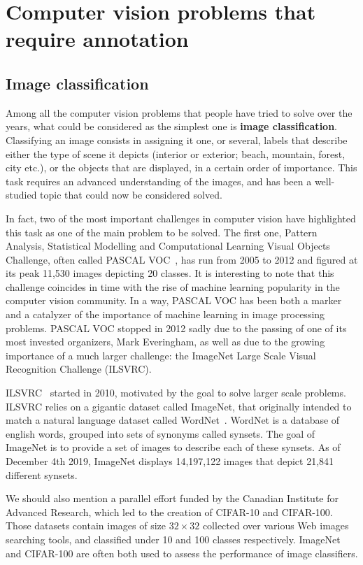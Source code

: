\section{Computer vision problems that require annotation}%
\label{sec:cv_annot}

\subsection{Image classification}

Among all the computer vision problems that people have tried to solve over the years,
what could be considered as the simplest one is \textbf{image classification}.
Classifying an image consists in assigning it one, or several,
labels that describe either the type of scene it depicts (interior or exterior;
beach, mountain, forest, city etc.),
or the objects that are displayed, in a certain order of importance.
This task requires an advanced understanding of the images,
and has been a well-studied topic that could now be considered solved.

In fact, two of the most important challenges in computer vision
have highlighted this task as one of the main problem to be solved.
The first one, Pattern Analysis, Statistical Modelling and Computational
Learning Visual Objects Challenge, often called PASCAL VOC~\cite{Everingham10},
has run from 2005 to 2012 and figured at its peak 11,530 images depicting 20 classes.
It is interesting to note that this challenge coincides in time
with the rise of machine learning popularity in the computer vision community.
In a way, PASCAL VOC has been both a marker and a catalyzer of the importance
of machine learning in image processing problems.
PASCAL VOC stopped in 2012 sadly due to
the passing of one of its most invested organizers, Mark Everingham,
as well as due to the growing importance of a much larger challenge:
the ImageNet Large Scale Visual Recognition Challenge (ILSVRC).

ILSVRC~\cite{ILSVRC15} started in 2010,
motivated by the goal to solve larger scale problems.
ILSVRC relies on a gigantic dataset called ImageNet,
that originally intended to match a natural language
dataset called WordNet~\cite{miller1995wordnet}.
WordNet is a database of english words, grouped into sets of synonyms called synsets.
The goal of ImageNet is to provide a set of images to describe each of these synsets.
As of December 4th 2019, ImageNet displays 14,197,122 images that depict 21,841 different synsets.

We should also mention a parallel effort funded by
the Canadian Institute for Advanced Research,
which led to the creation of CIFAR-10 and CIFAR-100.
Those datasets contain images of size $32 \times 32$ collected
over various Web images searching tools,
and classified under 10 and 100 classes respectively.
ImageNet and CIFAR-100 are often both used to assess the performance of image classifiers.

